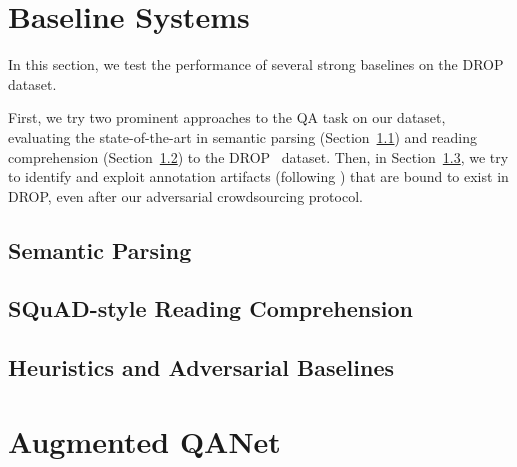 \documentclass[11pt,a4paper]{article}
\newcommand{\secref}[1]{Section~\ref{sec:#1}}
\newcommand{\drop}[0]{DROP}
\begin{document}
\section{Baseline Systems}
\label{sec:baselines}

In this section, we test the performance of several strong baselines on the
\drop~ dataset.

First, we try two prominent approaches to the QA task on our dataset, evaluating
the state-of-the-art in semantic parsing (\secref{semparse}) and reading comprehension (\secref{rc}) to the \drop~ dataset.
Then, in \secref{heuristics},
we try to identify and exploit annotation artifacts (following \cite{Gururangan:2018,Kaushik2018HowMR})
that are bound to exist in \drop, even after our adversarial crowdsourcing protocol.

\subsection{Semantic Parsing}
\label{sec:semparse}


\subsection{SQuAD-style Reading Comprehension}
\label{sec:rc}


\subsection{Heuristics and Adversarial Baselines}
\label{sec:heuristics}



\section{Augmented QANet}
\label{sec:model}

\end{document}

